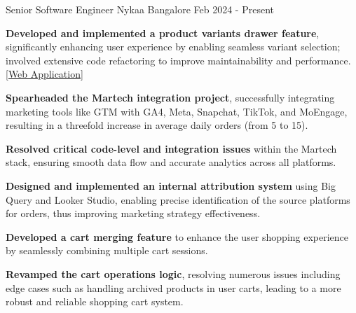 

\begin{cventries}


  \cventry
  {Senior Software Engineer}
  {Nykaa}
  {Bangalore}
  {Feb 2024 - Present}
  {
    \begin{cvitems}
      \item {\textbf{Developed and implemented a product variants drawer feature}, significantly enhancing user experience by enabling seamless variant selection; involved extensive code refactoring to improve maintainability and performance. \href{https://nysaa.com}{[Web Application]}}
      \item {\textbf{Spearheaded the Martech integration project}, successfully integrating marketing tools like GTM with GA4, Meta, Snapchat, TikTok, and MoEngage, resulting in a threefold increase in average daily orders (from 5 to 15).}
      \item {\textbf{Resolved critical code-level and integration issues} within the Martech stack, ensuring smooth data flow and accurate analytics across all platforms.}
      \item {\textbf{Designed and implemented an internal attribution system} using Big Query and Looker Studio, enabling precise identification of the source platforms for orders, thus improving marketing strategy effectiveness.}
      \item {\textbf{Developed a cart merging feature} to enhance the user shopping experience by seamlessly combining multiple cart sessions.}
      \item {\textbf{Revamped the cart operations logic}, resolving numerous issues including edge cases such as handling archived products in user carts, leading to a more robust and reliable shopping cart system.}
    \end{cvitems}
  }




\end{cventries}
